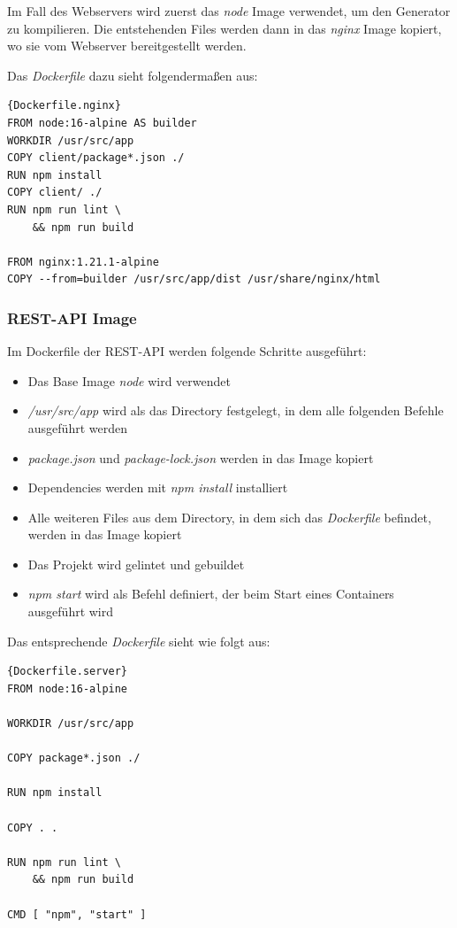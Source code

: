 Im Fall des Webservers wird zuerst das \textit{node} Image verwendet, um den Generator zu kompilieren.
Die entstehenden Files werden dann in das \textit{nginx} Image kopiert, wo sie vom Webserver bereitgestellt werden.

Das \textit{Dockerfile} dazu sieht folgendermaßen aus:

\begin{lstlisting}[label={lst:Dockerfile.nginx}]{Dockerfile.nginx}
FROM node:16-alpine AS builder
WORKDIR /usr/src/app
COPY client/package*.json ./
RUN npm install
COPY client/ ./
RUN npm run lint \
    && npm run build

FROM nginx:1.21.1-alpine
COPY --from=builder /usr/src/app/dist /usr/share/nginx/html
\end{lstlisting}

\subsubsection{REST-API Image}
Im Dockerfile der REST-API werden folgende Schritte ausgeführt:

\begin{itemize}
    \item Das Base Image \textit{node} wird verwendet
    \item \textit{/usr/src/app} wird als das Directory festgelegt, in dem alle folgenden Befehle ausgeführt werden
    \item \textit{package.json} und \textit{package-lock.json} werden in das Image kopiert
    \item Dependencies werden mit \textit{npm install} installiert
    \item Alle weiteren Files aus dem Directory, in dem sich das \textit{Dockerfile} befindet, werden in das Image kopiert
    \item Das Projekt wird gelintet und gebuildet
    \item \textit{npm start} wird als Befehl definiert, der beim Start eines Containers ausgeführt wird
\end{itemize}

Das entsprechende \textit{Dockerfile} sieht wie folgt aus:

\begin{lstlisting}[label={lst:Dockerfile.server}]{Dockerfile.server}
FROM node:16-alpine

WORKDIR /usr/src/app

COPY package*.json ./

RUN npm install

COPY . .

RUN npm run lint \
    && npm run build

CMD [ "npm", "start" ]
\end{lstlisting}


